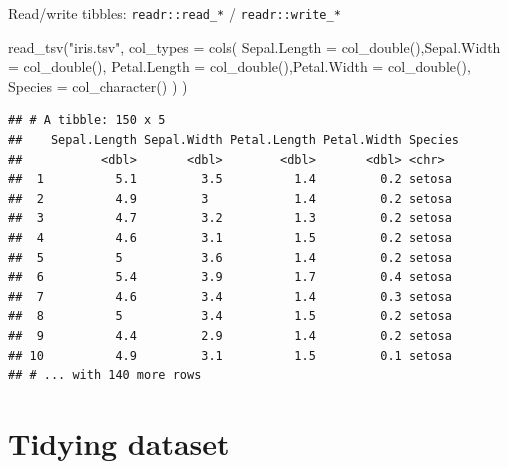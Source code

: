 \documentclass[14pt,ignorenonframetext,]{bredelebeamer}
\newenvironment{Shaded}{\begin{snugshade}}{\end{snugshade}}
\newcommand{\KeywordTok}[1]{\textcolor[rgb]{0.94,0.87,0.69}{#1}}
\newcommand{\DataTypeTok}[1]{\textcolor[rgb]{0.87,0.87,0.75}{#1}}
\newcommand{\StringTok}[1]{\textcolor[rgb]{0.80,0.58,0.58}{#1}}
\newcommand{\NormalTok}[1]{\textcolor[rgb]{0.80,0.80,0.80}{#1}}
\begin{document}
\begin{frame}[fragile]{Read/write tibbles: \texttt{readr::read\_*} /
\texttt{readr::write\_*}}

\begin{Shaded}
\begin{Highlighting}[]
\KeywordTok{read_tsv}\NormalTok{(}\StringTok{"iris.tsv"}\NormalTok{,}
         \DataTypeTok{col_types =} \KeywordTok{cols}\NormalTok{(}
            \DataTypeTok{Sepal.Length =} \KeywordTok{col_double}\NormalTok{(),}\DataTypeTok{Sepal.Width =} \KeywordTok{col_double}\NormalTok{(),}
            \DataTypeTok{Petal.Length =} \KeywordTok{col_double}\NormalTok{(),}\DataTypeTok{Petal.Width =} \KeywordTok{col_double}\NormalTok{(),}
            \DataTypeTok{Species =} \KeywordTok{col_character}\NormalTok{()}
\NormalTok{         )}
\NormalTok{    )}
\end{Highlighting}
\end{Shaded}

\begin{verbatim}
## # A tibble: 150 x 5
##    Sepal.Length Sepal.Width Petal.Length Petal.Width Species
##           <dbl>       <dbl>        <dbl>       <dbl> <chr>  
##  1          5.1         3.5          1.4         0.2 setosa 
##  2          4.9         3            1.4         0.2 setosa 
##  3          4.7         3.2          1.3         0.2 setosa 
##  4          4.6         3.1          1.5         0.2 setosa 
##  5          5           3.6          1.4         0.2 setosa 
##  6          5.4         3.9          1.7         0.4 setosa 
##  7          4.6         3.4          1.4         0.3 setosa 
##  8          5           3.4          1.5         0.2 setosa 
##  9          4.4         2.9          1.4         0.2 setosa 
## 10          4.9         3.1          1.5         0.1 setosa 
## # ... with 140 more rows
\end{verbatim}

\end{frame}

\section{Tidying dataset}\label{tidying-dataset}
\end{document}
